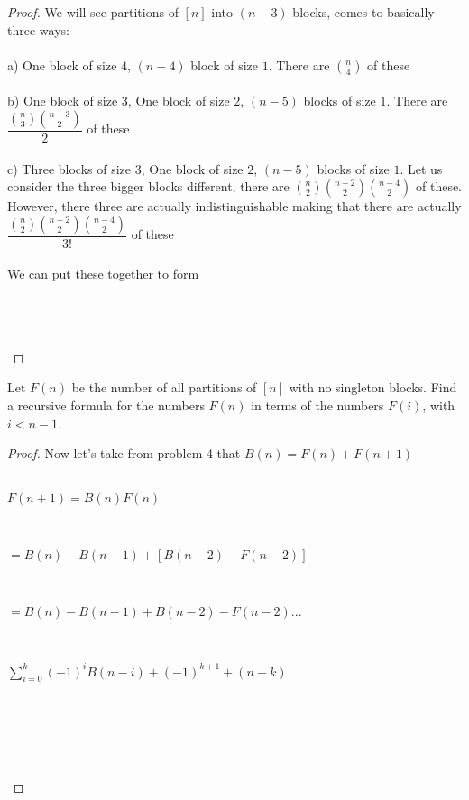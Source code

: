 \documentclass[12pt]{article}
\newenvironment{problem}[2][Problem]{\begin{trivlist}
\item[\hskip \labelsep {\bfseries #1}\hskip \labelsep {\bfseries #2.}]}{\end{trivlist}}
\begin{document}
\begin{proof}
We will see partitions of $[n]$ into $(n-3)$ blocks, comes to basically three ways: \\ \\
a) One block of size $4$, $(n-4)$ block of size $1$. There are $\displaystyle{n \choose 4}$ of these \\ \\
b) One block of size $3$, One block of size $2$, $(n-5)$ blocks of size $1$. There are $\dfrac{\displaystyle{n \choose 3}{n-3 \choose 2}}{2}$ of these \\ \\
c) Three blocks of size $3$, One block of size $2$, $(n-5)$ blocks of size $1$. Let us consider the three bigger blocks different, there are $\displaystyle{n \choose 2}{n-2 \choose 2}{n-4 \choose 2}$ of these. However, there three are actually indistinguishable making that there are actually $\dfrac{\displaystyle{n \choose 2}{n-2 \choose 2}{n-4 \choose 2}}{3!}$ of these \\ \\
We can put these together to form \\ \\
\centerline{} \\ \\

\end{proof}

\begin{problem}{3}
Let $F(n)$ be the number of all partitions of $[n]$ with no singleton blocks. Find a recursive formula for the numbers $F(n)$ in terms of the numbers $F(i)$, with $i < n-1$.
\end{problem}

\begin{proof}
Now let's take from problem 4 that $B(n) = F(n) + F(n+1)$ \\ \\
\centerline{$F(n+1) = B(n)F(n)$} \\
\centerline{$=B(n)-B(n-1)+[B(n-2)-F(n-2)]$} \\
\centerline{$=B(n)-B(n-1)+B(n-2)-F(n-2)...$}\\
\centerline{$\displaystyle \sum_{i=0}^{k}(-1)^iB(n-i)+(-1)^{k+1}+(n-k)$} \\ \\
\centerline{} \\ \\

\end{proof}
\end{document}
